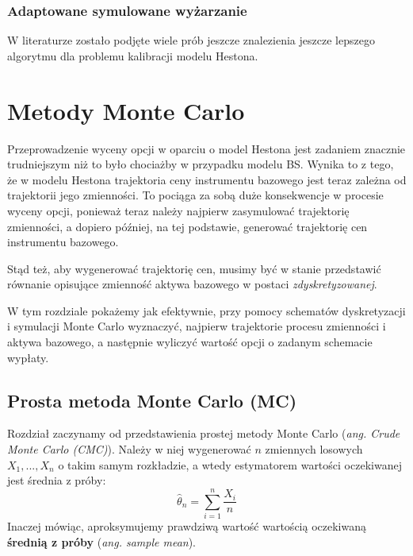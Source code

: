 \documentclass{pracamgr}
\begin{document}

\subsection{Adaptowane symulowane wyżarzanie}

W literaturze zostało podjęte wiele prób jeszcze znalezienia jeszcze lepszego algorytmu dla problemu kalibracji modelu Hestona. 





\chapter{Metody Monte Carlo}
\label{chap:monteCarlo}

Przeprowadzenie wyceny opcji w oparciu o model Hestona jest zadaniem znacznie trudniejszym
niż to było chociażby w przypadku modelu BS. Wynika to z tego, że w modelu Hestona trajektoria 
ceny instrumentu bazowego jest teraz zależna od trajektorii jego zmienności. To pociąga za sobą 
duże konsekwencje w procesie wyceny opcji, ponieważ teraz należy najpierw zasymulować trajektorię zmienności, a dopiero później, na tej podstawie, generować trajektorię cen instrumentu bazowego.

Stąd też, aby wygenerować trajektorię cen, musimy być w stanie przedstawić równanie opisujące
zmienność aktywa bazowego w postaci \textit{zdyskretyzowanej}.

W tym rozdziale pokażemy jak efektywnie, przy pomocy schematów dyskretyzacji i symulacji Monte Carlo wyznaczyć, 
najpierw trajektorie procesu zmienności i aktywa bazowego, a następnie wyliczyć wartość opcji o zadanym schemacie
wypłaty.

\section{Prosta metoda Monte Carlo (MC)}
\label{sec:mc}

Rozdział zaczynamy od przedstawienia prostej metody Monte Carlo (\textit{ang. Crude Monte Carlo (CMC)}).
Należy w niej wygenerować $n$ zmiennych losowych $X_1, ..., X_n$ o takim samym rozkładzie, a wtedy estymatorem wartości
oczekiwanej jest średnia z próby:
\begin{equation}
  \hat{\theta}_n = \sum_{i=1}^n \frac{X_i}{n}
\end{equation}
Inaczej mówiąc, aproksymujemy prawdziwą wartość wartością oczekiwaną \textbf{średnią z próby} (\textit{ang. sample mean}).
\end{document}

